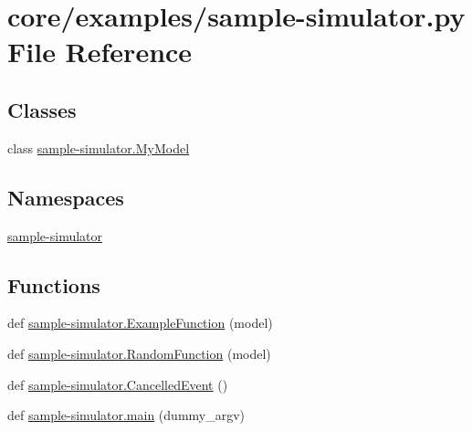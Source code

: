 \hypertarget{sample-simulator_8py}{}\section{core/examples/sample-\/simulator.py File Reference}
\label{sample-simulator_8py}
\subsection*{Classes}
\begin{DoxyCompactItemize}
\item 
class \hyperlink{classsample-simulator_1_1MyModel}{sample-\/simulator.\+My\+Model}
\end{DoxyCompactItemize}
\subsection*{Namespaces}
\begin{DoxyCompactItemize}
\item 
 \hyperlink{namespacesample-simulator}{sample-\/simulator}
\end{DoxyCompactItemize}
\subsection*{Functions}
\begin{DoxyCompactItemize}
\item 
def \hyperlink{namespacesample-simulator_ade35881457d87c30c3bc5108d180e622}{sample-\/simulator.\+Example\+Function} (model)
\item 
def \hyperlink{namespacesample-simulator_a7294dc5f174535f39f155b138bde4cd5}{sample-\/simulator.\+Random\+Function} (model)
\item 
def \hyperlink{namespacesample-simulator_a140dddfb670ce962550d23ac80cbc384}{sample-\/simulator.\+Cancelled\+Event} ()
\item 
def \hyperlink{namespacesample-simulator_a6f1917308f3401cc11cbafea25428edf}{sample-\/simulator.\+main} (dummy\+\_\+argv)
\end{DoxyCompactItemize}
